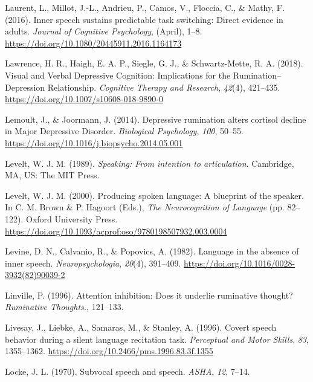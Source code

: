 \documentclass[a4paper,12pt,twoside,openright,oldfontcommands]{memoir}
\begin{document}
\leavevmode\hypertarget{ref-Laurent2016}{}%
Laurent, L., Millot, J.-L., Andrieu, P., Camos, V., Floccia, C., \& Mathy, F. (2016). Inner speech sustains predictable task switching: Direct evidence in adults. \emph{Journal of Cognitive Psychology}, (April), 1--8. \url{https://doi.org/10.1080/20445911.2016.1164173}

\leavevmode\hypertarget{ref-lawrence_visual_2018}{}%
Lawrence, H. R., Haigh, E. A. P., Siegle, G. J., \& Schwartz-Mette, R. A. (2018). Visual and Verbal Depressive Cognition: Implications for the Rumination--Depression Relationship. \emph{Cognitive Therapy and Research}, \emph{42}(4), 421--435. \url{https://doi.org/10.1007/s10608-018-9890-0}

\leavevmode\hypertarget{ref-Lemoult2014}{}%
Lemoult, J., \& Joormann, J. (2014). Depressive rumination alters cortisol decline in Major Depressive Disorder. \emph{Biological Psychology}, \emph{100}, 50--55. \url{https://doi.org/10.1016/j.biopsycho.2014.05.001}

\leavevmode\hypertarget{ref-levelt_speaking:_1989}{}%
Levelt, W. J. M. (1989). \emph{Speaking: From intention to articulation}. Cambridge, MA, US: The MIT Press.

\leavevmode\hypertarget{ref-brown_producing_2000}{}%
Levelt, W. J. M. (2000). Producing spoken language: A blueprint of the speaker. In C. M. Brown \& P. Hagoort (Eds.), \emph{The Neurocognition of Language} (pp. 82--122). Oxford University Press. \url{https://doi.org/10.1093/acprof:oso/9780198507932.003.0004}

\leavevmode\hypertarget{ref-levine_language_1982}{}%
Levine, D. N., Calvanio, R., \& Popovics, A. (1982). Language in the absence of inner speech. \emph{Neuropsychologia}, \emph{20}(4), 391--409. \url{https://doi.org/10.1016/0028-3932(82)90039-2}

\leavevmode\hypertarget{ref-linville_attention_1996}{}%
Linville, P. (1996). Attention inhibition: Does it underlie ruminative thought? \emph{Ruminative Thoughts.}, 121--133.

\leavevmode\hypertarget{ref-livesay_covert_1996}{}%
Livesay, J., Liebke, A., Samaras, M., \& Stanley, A. (1996). Covert speech behavior during a silent language recitation task. \emph{Perceptual and Motor Skills}, \emph{83}, 1355--1362. \url{https://doi.org/10.2466/pms.1996.83.3f.1355}

\leavevmode\hypertarget{ref-locke_subvocal_1970-1}{}%
Locke, J. L. (1970). Subvocal speech and speech. \emph{ASHA}, \emph{12}, 7--14.
\end{document}
